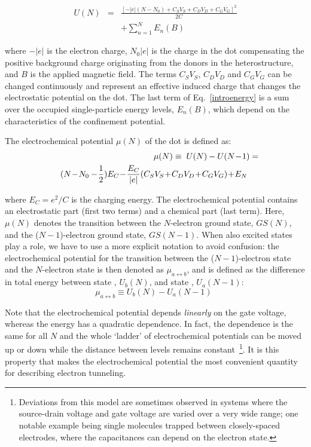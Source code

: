 \documentclass[rmp,twocolumn,aps]{revtex4}
\begin{document}
\begin{eqnarray}
U(N) &=& \frac{[-|e|(N\!-\!N_0) + C_S V_{S}+C_D V_{D}+ C_G V_G]^2}{2C} \nonumber \\
&&+ \sum_{n=1}^N E_n(B) \label{introenergy}
\end{eqnarray}

\noindent where $-|e|$ is the electron charge, $N_0 |e|$ is the charge in the dot compensating the positive background charge originating from the donors in the heterostructure, and $B$ is the applied magnetic field. The terms $C_S V_{S}$, $C_D V_{D}$ and $C_G V_G$ can be changed continuously and represent an effective induced charge that changes the electrostatic potential on the dot. The last term of Eq.~\ref{introenergy} is a sum over the occupied single-particle energy levels, $E_n(B)$, which depend on the characteristics of the confinement potential.

The electrochemical potential $\mu(N)$ of the dot is defined as:
\begin{eqnarray}
&&\mu(N) \equiv \hspace{0.1cm} U(N) - U(N\!-\!1)= \nonumber \\
 &&(N\!-\! N_0 -\!\frac{1}{2})E_C\! -\! \frac{E_C}{|e|}
(C_S V_{S}\!+\! C_D V_{D}\! +\! C_G V_G)\! +\! E_N \ \ \ \ 
\label{mu}
\end{eqnarray}

\noindent where $E_C=e^2/C$ is the charging energy. The
electrochemical potential contains an electrostatic part (first
two terms) and a chemical part (last term). Here, $\mu(N)$ denotes
the transition between the $N$-electron ground state, $GS(N)$, and
the ($N\!-\!1$)-electron ground state, $GS(N\!-\!1)$. When also
excited states play a role, we have to use a more explicit
notation to avoid confusion: the electrochemical potential for the
transition between the ($N-1$)-electron state \ket{\:a} and the
$N$-electron state  is then denoted as
$\mu_{a\leftrightarrow b}$, and is defined as the difference in
total energy between state \ket{\:b}, $U_b(N)$, and state
, $U_a(N\!-\!1)$:
\begin{equation}
\mu_{a\leftrightarrow b} \equiv U_b(N) -U_a(N\!-\!1)\ \
\label{mu2}
\end{equation}

Note that the electrochemical potential depends \textit{linearly}
on the gate voltage, whereas the energy has a quadratic
dependence. In fact, the dependence is the same for all $N$ and
the whole `ladder' of electrochemical potentials can be moved up
or down while the distance between levels remains
constant~\footnote{Deviations from this model are sometimes
observed in systems where the source-drain voltage and gate
voltage are varied over a very wide range; one notable example
being single molecules trapped between closely-spaced electrodes,
where the capacitances can depend on the electron state.}. It is
this property that makes the electrochemical potential the most
convenient quantity for describing electron tunneling.
\end{document}
